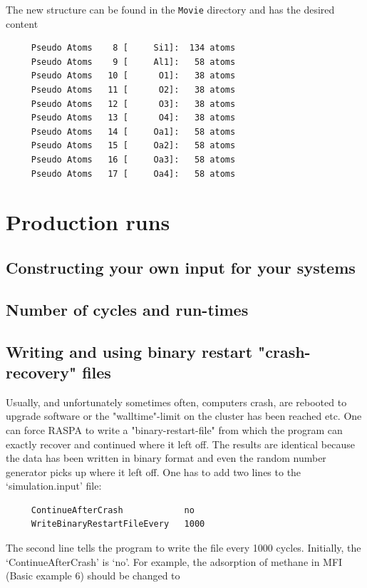 The new structure can be found in the \verb+Movie+ directory and has the desired content
\begin{tiny}
\begin{verbatim}
     Pseudo Atoms    8 [     Si1]:  134 atoms
     Pseudo Atoms    9 [     Al1]:   58 atoms
     Pseudo Atoms   10 [      O1]:   38 atoms
     Pseudo Atoms   11 [      O2]:   38 atoms
     Pseudo Atoms   12 [      O3]:   38 atoms
     Pseudo Atoms   13 [      O4]:   38 atoms
     Pseudo Atoms   14 [     Oa1]:   58 atoms
     Pseudo Atoms   15 [     Oa2]:   58 atoms
     Pseudo Atoms   16 [     Oa3]:   58 atoms
     Pseudo Atoms   17 [     Oa4]:   58 atoms
\end{verbatim}
\end{tiny}

\section{Production runs}

\subsection*{Constructing your own input for your systems}

\subsection*{Number of cycles and run-times}

\subsection*{Writing and using binary restart "crash-recovery" files}

Usually, and unfortunately sometimes often, computers crash, are rebooted to upgrade software or the "walltime"-limit on the cluster has been reached etc.
One can force RASPA to write a "binary-restart-file" from which the program can exactly recover and continued
where it left off. The results are identical because the data has been written in binary format and even the
random number generator picks up where it left off.
One has to add two lines to the `simulation.input' file:
\begin{tiny}
\begin{verbatim}
     ContinueAfterCrash            no
     WriteBinaryRestartFileEvery   1000
\end{verbatim}
\end{tiny}
The second line tells the program to write the file every 1000 cycles. Initially, the `ContinueAfterCrash' is `no'.
For example, the adsorption of methane in MFI (Basic example 6) should be changed to


